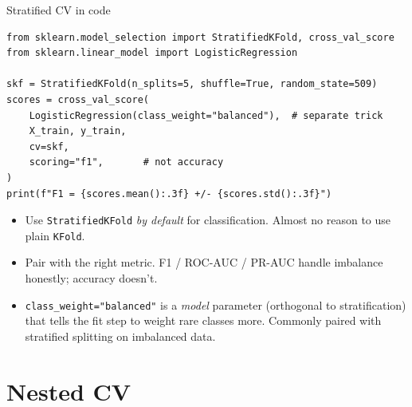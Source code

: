 \documentclass[aspectratio=169]{beamer}
\begin{document}
\begin{frame}[fragile]{Stratified CV in code}
\begin{lstlisting}
from sklearn.model_selection import StratifiedKFold, cross_val_score
from sklearn.linear_model import LogisticRegression

skf = StratifiedKFold(n_splits=5, shuffle=True, random_state=509)
scores = cross_val_score(
    LogisticRegression(class_weight="balanced"),  # separate trick
    X_train, y_train,
    cv=skf,
    scoring="f1",       # not accuracy
)
print(f"F1 = {scores.mean():.3f} +/- {scores.std():.3f}")
\end{lstlisting}
  \vfill
  \begin{itemize}\small
    \item Use \texttt{StratifiedKFold} \emph{by default} for classification. Almost no reason to use plain \texttt{KFold}.
    \item Pair with the right metric. F1 / ROC-AUC / PR-AUC handle imbalance honestly; accuracy doesn't.
    \item \texttt{class\_weight="balanced"} is a \emph{model} parameter (orthogonal to stratification) that tells the fit step to weight rare classes more. Commonly paired with stratified splitting on imbalanced data.
  \end{itemize}
\end{frame}


\section{Nested CV}
\end{document}

